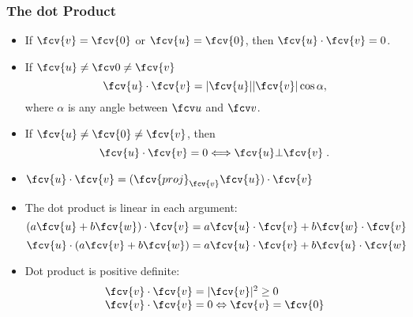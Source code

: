 \begin{frame}
\frametitle{The dot Product}
\begin{itemize}
\item<1-> If $\fcv{v}=\fcv{0}$ or $\fcv{u}=\fcv{0}$, then $\fcv{u}\cdot \fcv{v} =0$.
\item<2-> If $\fcv{u} \neq \fcv 0 \neq \fcv{v}$
\[
\fcv{u} \cdot \fcv{v} = |\fcv{u}|  |\fcv{v}| \cos{\alpha},
\]
where $\alpha$ is any angle between $\fcv u$ and $\fcv v$.
\item<3-> If $\fcv{u}\neq \fcv{0} \neq \fcv{v}$, then
$$\fcv{u} \cdot \fcv{v} = 0 \Longleftrightarrow \fcv{u} \bot \fcv{v}\; .$$
\item<4-> $\fcv{u} \cdot \fcv{v} = (\fcv{proj}_{\fcv{v}} \fcv{u}) \cdot \fcv{v}$
\item<5-> The dot product is linear in each argument:
\[
(a \fcv{u} + b \fcv{w}) \cdot \fcv{v} = a \fcv{u} \cdot \fcv{v} + b \fcv{w} \cdot \fcv{v}
\]
\[
\fcv{u} \cdot (a \fcv{v} + b \fcv{w}) = a \fcv{u} \cdot \fcv{v} + b \fcv{u} \cdot \fcv{w}
\]
\item<6-> Dot product is positive definite:
\[
\begin{array}{l}
\fcv{v} \cdot \fcv{v} = |\fcv{v}|^2 \geq 0 \\
\fcv{v}\cdot \fcv{v} = 0 \Leftrightarrow \fcv{v}=\fcv{0}
\end{array}
\]
\end{itemize}

\end{frame}
